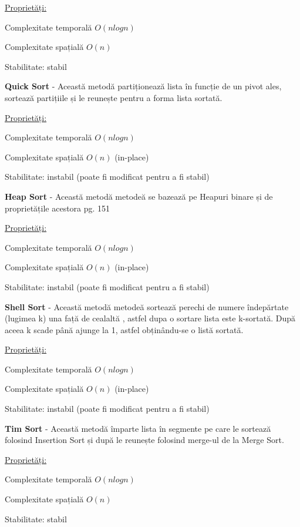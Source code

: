 \documentclass[12pt]{article}
\begin{document}
\underline {Proprietăți:}

Complexitate temporală $O(n log n)$

Complexitate spațială $O(n)$

Stabilitate: stabil\newline

{\bf Quick Sort} - Această metodă partiționează lista în funcție de un pivot ales, sortează partițiile și le reunește pentru a forma lista sortată.

\underline {Proprietăți:}

Complexitate temporală $O(n log n)$

Complexitate spațială $O(n)$ (in-place)

Stabilitate: instabil (poate fi modificat pentru a fi stabil)\newline

{\bf Heap Sort} - Această metodă metodeă se bazează pe Heapuri binare și de proprietățile acestora \cite{cormenIntroduction} pg. 151

\underline {Proprietăți:}

Complexitate temporală $O(n log n)$

Complexitate spațială $O(n)$ (in-place)

Stabilitate: instabil (poate fi modificat pentru a fi stabil)\newline

{\bf Shell Sort} - Această metodă metodeă sortează perechi de numere îndepărtate (lugimea k) una față de cealaltă
, astfel dupa o sortare lista este k-sortată. După aceea k scade până ajunge la 1, astfel obținându-se o listă sortată.

\underline {Proprietăți:}

Complexitate temporală $O(n log n)$

Complexitate spațială $O(n)$ (in-place)

Stabilitate: instabil (poate fi modificat pentru a fi stabil)\newline

{\bf Tim Sort} - Această metodă împarte lista în segmente pe care le sortează folosind Insertion Sort și după le reunește
folosind merge-ul de la Merge Sort.

\underline {Proprietăți:}

Complexitate temporală $O(n log n)$

Complexitate spațială $O(n)$

Stabilitate: stabil\newline
\end{document}
